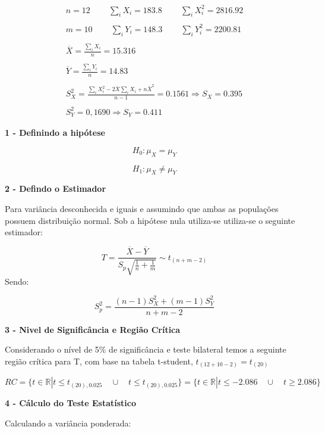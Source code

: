 \documentclass[
  letterpaper,
  DIV=11,
  numbers=noendperiod]{scrartcl}
\begin{document}
\[\begin{array}{ccc}
n=12 \ \qquad \sum_iX_i=183.8 \ \qquad \sum_iX_i^2=2816.92
\\
\\
m=10 \ \qquad \sum_iY_i=148.3 \ \qquad \sum_iY_i^2=2200.81
\\
\\
\overline{X}=\frac{\sum_iX_i}{n}=15.316
\\
\\
\overline{Y}=\frac{\sum_iY_i}{n}=14.83
\\
\\
S_X^2=\frac{\sum_iX_i^2-2\overline{X}\sum_iX_i+n\overline{X}^2}{n-1}=0.1561 \Rightarrow S_X=0.395
\\
\\
S_Y^2=0,1690 \Rightarrow  S_Y=0.411
\end{array}\]

\vspace{0.5cm}

\textbf{1 - Definindo a hipótese}

\[H_0: \mu_X=\mu_Y\]

\[H_1: \mu_X\neq\mu_Y\]

\vspace{0.5cm}

\textbf{2 - Defindo o Estimador}

Para variância desconhecida e iguais e assumindo que ambas as populações
possuem distribuição normal. Sob a hipótese nula utiliza-se utiliza-se o
seguinte estimador:

\[T=\frac{\overline{X}-\overline{Y}}{S_p\sqrt{\frac{1}{n}+\frac{1}{m}}}\sim t_{(n+m-2)}\]
Sendo:

\[S_p^2=\frac{(n-1)S_X^2+(m-1)S_Y^2}{n+m-2}\]

\vspace{0.5cm}

\textbf{3 - Nivel de Significância e Região Crítica}

Considerando o nível de 5\% de significância e teste bilateral temos a
seguinte região crítica para T, com base na tabela t-student,
\(t_{(12+10-2)}=t_{(20)}\)

\[RC=\{t \in \mathbb{R} |t\leq t_{(20),0.025} \quad \cup \quad t\leq t_{(20),0.025} \} = \{t \in \mathbb{R} |t\leq -2.086 \quad \cup \quad t\geq 2.086 \}\]

\vspace{0.5cm}

\textbf{4 - Cálculo do Teste Estatístico}

Calculando a variância ponderada:
\end{document}
